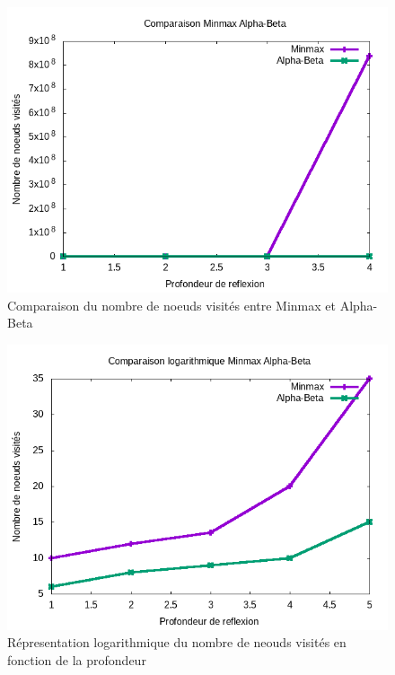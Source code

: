 \documentclass[12pt]{article}
\begin{document}
\begin{figure}[ht!]
	\begin{center}
		\includegraphics[width=1\textwidth]{fig3.png}
	\end{center}
	\caption{Comparaison du nombre de noeuds visités entre Minmax et Alpha-Beta}
	\label{fig1}
\end{figure}

\begin{figure}[ht!]
	\begin{center}
		\includegraphics[width=1\textwidth]{fig1.png}
	\end{center}
	\caption{Répresentation logarithmique du nombre de neouds visités en fonction de la profondeur}
	\label{fig2}
\end{figure}
\end{document}
